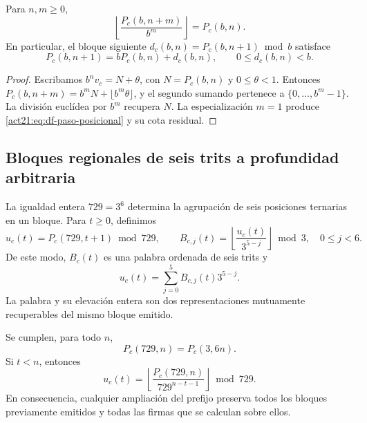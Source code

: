 \begin{proposition}
\label{act21:prop:df-prefijos-compatibles}
Para \(n,m\geq0\),
\begin{equation}
 \left\lfloor\frac{P_c(b,n+m)}{b^m}\right\rfloor=P_c(b,n).
 \label{act21:eq:df-truncamiento}
\end{equation}
En particular, el bloque siguiente
\(d_c(b,n)=P_c(b,n+1)\bmod b\) satisface
\begin{equation}
 P_c(b,n+1)=bP_c(b,n)+d_c(b,n),\qquad 0\leq d_c(b,n)<b.
 \label{act21:eq:df-paso-posicional}
\end{equation}
\end{proposition}

\begin{proof}
Escribamos \(b^n v_c=N+\theta\), con
\(N=P_c(b,n)\) y \(0\leq\theta<1\). Entonces
\(P_c(b,n+m)=b^mN+\lfloor b^m\theta\rfloor\), y el segundo sumando
pertenece a \(\{0,\ldots,b^m-1\}\). La división euclídea por \(b^m\)
recupera \(N\). La especialización \(m=1\) produce
\eqref{act21:eq:df-paso-posicional} y su cota residual.
\end{proof}

\subsection{Bloques regionales de seis trits a profundidad arbitraria}
\label{act21:subsec:df-bloques-arbitrarios}


La igualdad entera \(729=3^6\) determina la agrupación de seis posiciones
ternarias en un bloque. Para \(t\geq0\), definimos
\begin{equation}
 u_c(t)=P_c(729,t+1)\bmod729,
 \qquad
 B_{c,j}(t)=
 \left\lfloor\frac{u_c(t)}{3^{5-j}}\right\rfloor\bmod3,
 \quad 0\leq j<6.
 \label{act21:eq:df-bloque-y-banda}
\end{equation}
De este modo, \(B_c(t)\) es una palabra ordenada de seis trits y
\begin{equation}
 u_c(t)=\sum_{j=0}^{5}B_{c,j}(t)3^{5-j}.
 \label{act21:eq:df-elevacion-banda}
\end{equation}
La palabra y su elevación entera son dos representaciones mutuamente
recuperables del mismo bloque emitido.

\begin{theorem}
\label{act21:thm:df-bloque-estable}
Se cumplen, para todo \(n\),
\[
 P_c(729,n)=P_c(3,6n).
\]
Si \(t<n\), entonces
\begin{equation}
 u_c(t)=
 \left\lfloor\frac{P_c(729,n)}{729^{n-t-1}}\right\rfloor\bmod729.
 \label{act21:eq:df-bloque-prefijo-largo}
\end{equation}
En consecuencia, cualquier ampliación del prefijo preserva todos los
bloques previamente emitidos y todas las firmas que se calculan sobre ellos.
\end{theorem}

